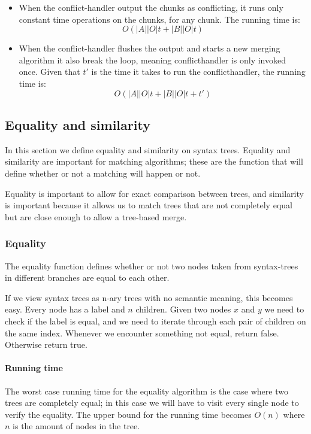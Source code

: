 \documentclass[11pt]{article}
\begin{document}
\begin{itemize}
	\item When the conflict-handler output the chunks as conflicting, it runs only constant time operations on the chunks, for any chunk. The running time is:\\
		\begin{equation}
			O(|A||O| t + |B||O| t) \nonumber
		\end{equation}

	
	\item When the conflict-handler flushes the output and starts a new merging algorithm it also break the loop, meaning conflicthandler is only invoked once. Given that $t'$ is the time it takes to run the conflicthandler, the running time is:\\
		\begin{equation}
			O(|A||O| t + |B||O| t + t') \nonumber
		\end{equation}

\end{itemize}


\subsection{Equality and similarity}
\label{EqSim}
In this section we define equality and similarity on syntax trees. Equality and similarity are important for matching algorithms; these are the function that will define whether or not a matching will happen or not.

Equality is important to allow for exact comparison between trees, and similarity is important because it allows us to match trees that are not completely equal but are close enough to allow a tree-based merge.

\subsubsection{Equality}
The equality function defines whether or not two nodes taken from syntax-trees in different branches are equal to each other.

If we view syntax trees as n-ary trees with no semantic meaning, this becomes easy. Every node has a label and $n$ children. Given two nodes $x$ and $y$ we need to check if the label is equal, and we need to iterate through each pair of children on the same index. Whenever we encounter something not equal, return false. Otherwise return true.

\paragraph{Running time} The worst case running time for the equality algorithm is the case where two trees are completely equal; in this case we will have to visit every single node to verify the equality. The upper bound for the running time becomes $O(n)$ where $n$ is the amount of nodes in the tree.
\end{document}
